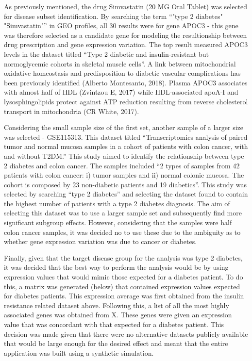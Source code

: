 \documentclass{bioinfo}
\begin{document}
\begin{methods}
As previously mentioned, the drug Simvastatin (20 MG Oral Tablet) was selected for disease subset identification. By searching the term “"type 2 diabetes" "Simvastatin"” in GEO profiles, all 30 results were for gene APOC3 - this gene was therefore selected as a candidate gene for modeling the resultionship between drug prescription and gene expression variation. The top result measured APOC3 levels in the dataset titled “Type 2 diabetic and insulin-resistant but normoglycemic cohorts in skeletal muscle cells”. A link between mitochondrial oxidative homeostasis and predisposition to diabetic vascular complications has been previously identified (Alberto Montesanto, 2018). Plasma APOC3 associates with almost half of HDL (Zvintzou E, 2017) while HDL-associated apoA-I and lysosphingolipids protect against ATP reduction resulting from reverse cholesterol transport in mitochondria (CR White, 2017). 

Considering the small sample size of the first set, another sample of a larger size was selected - GSE115313. This dataset titled “Transcriptomics analysis of paired tumor and normal mucosa samples in a cohort of patients with colon cancer, with and without T2DM.” This study aimed to identify the relationship between type 2 diabetes and colon cancer. The samples included ``2 types of samples from 42 patients with colon cancer: i) tumor samples and ii) normal colonic mucosa. The cohort is composed by 23 non-diabetic patients and 19 diabetics''. This study was selected by searching “type 2 diabetes” and selecting the dataset found to contain the highest number of patients with a type 2 diabetes diagnosis. The aim of selecting this dataset was to use a larger sample set and subsequently find more significant subgroup effects. However, considering that the samples were half colon cancer samples, it was decided no to use these due to the ambiguity as to whether gene expression variation was due to cancer or diabetes.

Finally, given that the target disease group for the analysis was type 2 diabetes, it was decided that the best way to perform the analysis would be by using expression values that would mimic those expected for a diabetes patient. To do this, a matrix was generated (below) that contained expression values expected for diabetes patients. This expression average was first obtained from the insulin resistance related dataset above. Following this, a list of all the most highly associated genes was obtained from X. These genes were given an expression value that was concordant with that expected for a diabetes patient. This decision was made given that there were no alternative datasets publicly available that would be large enough for the desired effect and meant that the entire application was built using a synthetic simulation.

\end{methods}
\end{document}
